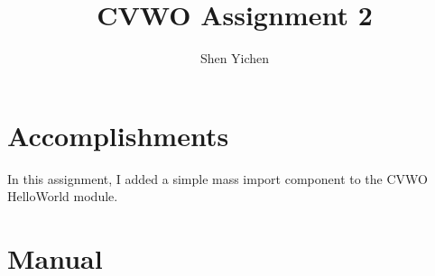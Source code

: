 \documentclass[12pt]{article}
\title{\textbf{\textsf{CVWO Assignment 2}}}
\date{}
\author{\textsf{Shen Yichen}}
\begin{document}
\maketitle

\section*{Accomplishments}

In this assignment, I added a simple mass import component to the CVWO HelloWorld module.


\section*{Manual}
\end{document}
